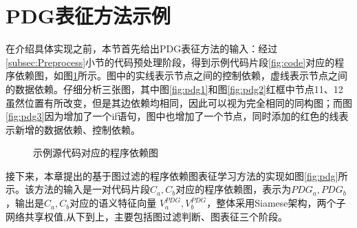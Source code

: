 \section{PDG表征方法示例}
\label{sec:PDGachieve}
在介绍具体实现之前，本节首先给出PDG表征方法的输入：经过\ref{subsec:Preprocess}小节的代码预处理阶段，得到示例代码片段\ref{fig:code}对应的程序依赖图，如图\ref{fig:pdgcode}所示。图中的实线表示节点之间的控制依赖，虚线表示节点之间的数据依赖。仔细分析三张图，其中图\ref{fig:pdg1}和图\ref{fig:pdg2}红框中节点11、12虽然位置有所改变，但是其边依赖均相同，因此可以视为完全相同的同构图；而图\ref{fig:pdg3}因为增加了一个if语句，图中也增加了一个节点，同时添加的红色的线表示新增的数据依赖、控制依赖。

\begin{figure}[htbp]
  \centering  %
  \caption{示例源代码对应的程序依赖图}    %
  \label{fig:pdgcode}    %
\end{figure}

接下来，本章提出的基于图过滤的程序依赖图表征学习方法的实现如图\ref{fig:pdg}所示。该方法的输入是一对代码片段$C_{a},C_{b}$对应的程序依赖图，表示为$PDG_{a},PDG_{b}$，输出是$C_{a},C_{b}$对应的语义特征向量 $V_{a}^{PDG},V_{b}^{PDG}$，整体采用Siamese架构，两个子网络共享权值,从下到上，主要包括图过滤判断、图表征三个阶段。

